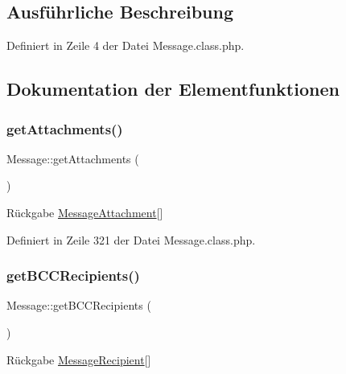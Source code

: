 \subsection{Ausführliche Beschreibung}


Definiert in Zeile 4 der Datei Message.\+class.\+php.



\subsection{Dokumentation der Elementfunktionen}
\mbox{\label{class_message_ac24cb04caf853807bbfc978a523a7852}} 
\subsubsection{\texorpdfstring{get\+Attachments()}{getAttachments()}}
{\footnotesize\ttfamily Message\+::get\+Attachments (\begin{DoxyParamCaption}{ }\end{DoxyParamCaption})}

\begin{DoxyReturn}{Rückgabe}
\mbox{\hyperlink{class_message_attachment}{Message\+Attachment}}\mbox{[}\mbox{]} 
\end{DoxyReturn}


Definiert in Zeile 321 der Datei Message.\+class.\+php.

\mbox{\label{class_message_a4f4c35c9066e6808a41f2d3058605d8f}} 
\subsubsection{\texorpdfstring{get\+B\+C\+C\+Recipients()}{getBCCRecipients()}}
{\footnotesize\ttfamily Message\+::get\+B\+C\+C\+Recipients (\begin{DoxyParamCaption}{ }\end{DoxyParamCaption})}

\begin{DoxyReturn}{Rückgabe}
\mbox{\hyperlink{class_message_recipient}{Message\+Recipient}}\mbox{[}\mbox{]} 
\end{DoxyReturn}


